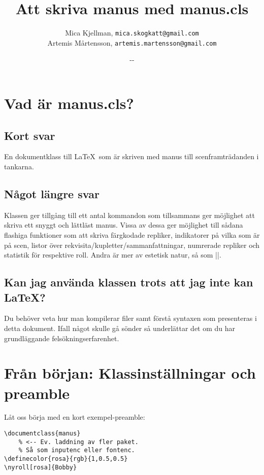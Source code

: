 \documentclass[a4paper,12pt]{article}
\newcommand*{\pack}{\textsf}
\renewcommand{\dateseparator}{-}
\newcommand{\todayiso}{%
	\the\year\dateseparator\twodigit\month\dateseparator\twodigit\day}
\begin{document}
\title{Att skriva manus med \pack{manus.cls}}
\author{%
	Mica Kjellman, \texttt{mica.skogkatt@gmail.com}\\%
	Artemis Mårtensson, \texttt{artemis.martensson@gmail.com}}
\date{\todayiso}
\maketitle



\newpage
\tableofcontents
\newpage



\section{Vad är \pack{manus.cls}?}

\subsection{Kort svar}
En dokumentklass till \LaTeX\ som är skriven med manus till scenframträdanden i tankarna.

\subsection{Något längre svar}
Klassen ger tillgång till ett antal kommandon som tillsammans ger möjlighet att skriva ett snyggt och lättläst manus. Vissa av dessa ger möjlighet till sådana flashiga funktioner som att skriva färgkodade repliker, indikatorer på vilka som är på scen, listor över rekvisita/kupletter/sammanfattningar, numrerade repliker och statistik för respektive roll. Andra är mer av estetisk natur, så som |\akt|. 

\subsection{Kan jag använda klassen trots att jag inte kan \LaTeX?}
Du behöver veta hur man kompilerar filer samt förstå syntaxen som presenteras i detta dokument. Ifall något skulle gå sönder så underlättar det om du har grundläggande felsökningserfarenhet.



\section{Från början: Klassinställningar och preamble}
Låt oss börja med en kort exempel-preamble:

\begin{lstlisting}
\documentclass{manus}
	% <-- Ev. laddning av fler paket.
	% Så som inputenc eller fontenc.
\definecolor{rosa}{rgb}{1,0.5,0.5}
\nyroll[rosa]{Bobby}
\end{lstlisting}
\end{document}
